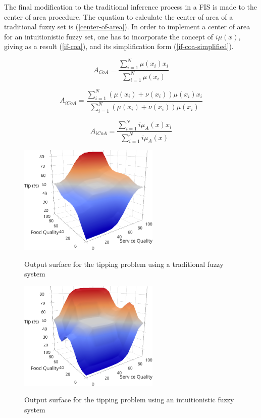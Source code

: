 \documentclass[review]{elsarticle}
\begin{document}
The final modification to the traditional inference process in a FIS is made to the center of area procedure. The equation to calculate the center of area of a traditional fuzzy set is (\ref{center-of-area}). In order to implement a center of area for an intuitionistic fuzzy set, one has to incorporate the concept of $i\mu(x)$, giving as a result (\ref{if-coa}), and its simplification form (\ref{if-coa-simplified}).

\begin{equation}
  \label{center-of-area}
  A_{CoA} = \dfrac{\sum_{i=1}^{N} \mu(x_{i})
    x_{i}}{\sum_{i=1}^{N} \mu(x_{i})}
\end{equation}

\begin{equation}
  \label{if-coa}
  A_{iCoA} = \dfrac{\sum_{i=1}^{N} (\mu(x_{i}) + \nu(x_{i})) \mu(x_{i})
    x_{i}}{\sum_{i=1}^{N} (\mu(x_{i}) + \nu(x_{i})) \mu(x_{i})}
\end{equation}

\begin{equation}
  \label{if-coa-simplified}
  A_{iCoA} = \dfrac{\sum_{i=1}^{N} i\mu_{A}(x) x_{i}}{\sum_{i=1}^{N}
    i\mu_{A}(x)}
\end{equation}

\begin{figure}
\caption{Output surface for the tipping problem using a traditional fuzzy system}
\centering
\includegraphics[width=0.6\textwidth]{img/fis-surface.png}
\label{figure:agent-based-model}
\end{figure}

\begin{figure}
\caption{Output surface for the tipping problem using an intuitionistic fuzzy system}
\centering
\includegraphics[width=0.6\textwidth]{img/ifis-surface.png}
\label{figure:agent-based-model}
\end{figure}
\end{document}
